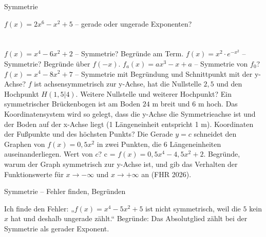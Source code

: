 \setcounter{aufgabe}{16}

\begin{aufgabe}{Symmetrie}
\begin{teile}
\teil $f(x) = 2x^6 - x^2 + 5$ – gerade oder ungerade Exponenten? \\  \\  \\ 
\teil $f(x) = x^4 - 6x^2 + 2$ – Symmetrie? Begründe am Term.
\teil $f(x) = x^2 \cdot e^{-x^2}$ – Symmetrie? Begründe über $f(-x)$.
\teil $f_a(x) = a x^3 - x + a$ – Symmetrie von $f_0$?
\teil $f(x) = x^4 - 8x^2 + 7$ – Symmetrie mit Begründung und Schnittpunkt mit der y-Achse?
\teil $f$ ist achsensymmetrisch zur y-Achse, hat die Nullstelle $2{,}5$ und den Hochpunkt $H(1{,}5 | 4)$. Weitere Nullstelle und weiterer Hochpunkt?
\teil Ein symmetrischer Brückenbogen ist am Boden $24$ m breit und $6$ m hoch. Das Koordinatensystem wird so gelegt, dass die y-Achse die Symmetrieachse ist und der Boden auf der x-Achse liegt (1 Längeneinheit entspricht 1 m). Koordinaten der Fußpunkte und des höchsten Punkts?
\teil Die Gerade $y = c$ schneidet den Graphen von $f(x) = 0{,}5x^2$ in zwei Punkten, die $6$ Längeneinheiten auseinanderliegen. Wert von $c$? c = \leerfeld
\teil $f(x) = 0{,}5x^4 - 4{,}5x^2 + 2$. Begründe, warum der Graph symmetrisch zur y-Achse ist, und gib das Verhalten der Funktionswerte für $x \to -\infty$ und $x \to +\infty$ an \hfill (FHR 2026).
\end{teile}
\end{aufgabe}

\begin{aufgabe}{Symmetrie – Fehler finden, Begründen}
\begin{teile}
\teil Ich finde den Fehler: „$f(x) = x^4 - 5x^2 + 5$ ist nicht symmetrisch, weil die $5$ kein $x$ hat und deshalb ungerade zählt.“
\teil Begründe: Das Absolutglied zählt bei der Symmetrie als gerader Exponent.
\end{teile}
\end{aufgabe}
